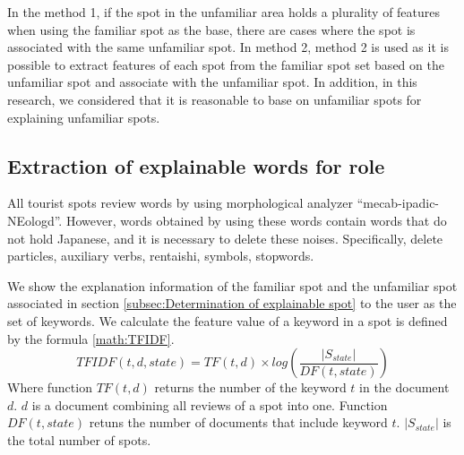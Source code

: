 \documentclass[journal]{IAENGtran}
\begin{document}
In the method 1, if the spot in the unfamiliar area holds a plurality of features when using the familiar spot as the base, there are cases where the spot is associated with the same unfamiliar spot.
In method 2, method 2 is used as it is possible to extract features of each spot from the familiar spot set based on the unfamiliar spot and associate with the unfamiliar spot.
In addition, in this research, we considered that it is reasonable to base on unfamiliar spots for explaining unfamiliar spots.

\subsection{Extraction of explainable words for role}
\label{subsec:Extraction of explainable words for role}
All tourist spots review words by using morphological analyzer ``mecab-ipadic-NEologd''.
However, words obtained by using these words contain words that do not hold Japanese, and it is necessary to delete these noises.
Specifically, delete particles, auxiliary verbs, rentaishi, symbols, stopwords.

We show the explanation information of the familiar spot and the unfamiliar spot associated in section \ref{subsec:Determination of explainable spot} to the user as the set of keywords.
We calculate the feature value of a keyword in a spot is defined by the formula \ref{math:TFIDF}.
\begin{equation}
  TFIDF(t,d,state) = TF(t,d) \times log(\frac{|S_{state}|}{DF(t,state)})
  \label{math:TFIDF}
\end{equation}
Where function $TF(t,d)$ returns the number of the keyword $t$ in the document $d$.
$d$ is a document combining all reviews of a spot into one.
Function $DF(t,state)$ retuns the number of documents that include keyword $t$.
$|S_{state}|$ is the total number of spots.
\end{document}
